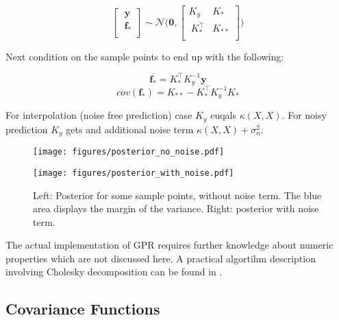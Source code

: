 \documentclass[english]{article}
\begin{document}
$$
\begin{bmatrix}
\ \mathbf{y}\ \\
\ \mathbf{f_*} \\
\end{bmatrix}
\sim \mathcal{N} \Bigg(\mathbf{0},
\begin{bmatrix}
K_y & K_* \\
\ K^{\top}_{*} & K_{**}  \\
\end{bmatrix}
\Bigg)
$$

Next condition on the sample points to end up with the following:

$$\overline{\mathbf{f_*}} = K_*^\top K_y^{-1}\mathbf{y}$$
$$cov(\mathbf{f_*}) = K_{**} - K_*^\top K_y^{-1} K_*$$

For interpolation (noise free prediction) case $K_y$ euqals $\kappa(X,X)$. For noisy prediction $K_y$ gets and additional noise term $\kappa(X,X) + \sigma_n^2$.

\begin{figure}

  \begin{minipage}{0.5\textwidth}
  \texttt{[image: figures/posterior\_no\_noise.pdf]}
  \end{minipage}%
  \begin{minipage}{0.5\textwidth}
  \texttt{[image: figures/posterior\_with\_noise.pdf]}
  \end{minipage}%

  \caption{Left: Posterior for some sample points, without noise term. The blue area displays the margin of the variance. Right: posterior with noise term.}

\end{figure}


The actual implementation of \ac{GPR} requires further knowledge about numeric properties which are not discussed here. A practical algortihm description involving Cholesky decomposition can be found in \cite[Algorithm 2.1]{rasmussen_gaussian_2006}.




\subsection{Covariance Functions}
\end{document}
